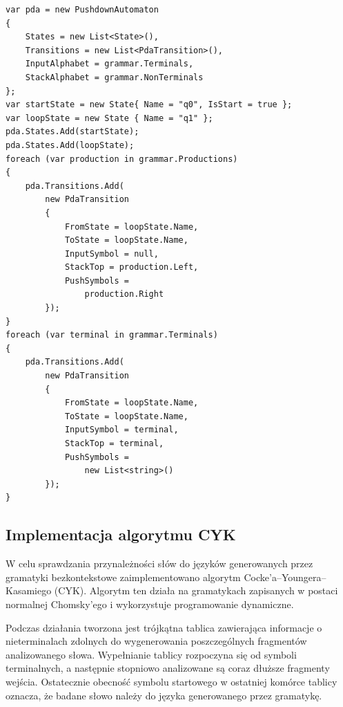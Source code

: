 \documentclass[12pt]{article}
\begin{document}
\begin{lstlisting}[language={[Sharp]C},
caption={Konstrukcja automatu ze stosem na podstawie gramatyki bezkontekstowej},
label={lst:cfg-pda}]
var pda = new PushdownAutomaton
{
    States = new List<State>(),
    Transitions = new List<PdaTransition>(),
    InputAlphabet = grammar.Terminals,
    StackAlphabet = grammar.NonTerminals
};
var startState = new State{ Name = "q0", IsStart = true };
var loopState = new State { Name = "q1" };
pda.States.Add(startState);
pda.States.Add(loopState);
foreach (var production in grammar.Productions)
{
    pda.Transitions.Add(
        new PdaTransition
        {
            FromState = loopState.Name,
            ToState = loopState.Name,
            InputSymbol = null,
            StackTop = production.Left,
            PushSymbols =
                production.Right
        });
}
foreach (var terminal in grammar.Terminals)
{
    pda.Transitions.Add(
        new PdaTransition
        {
            FromState = loopState.Name,
            ToState = loopState.Name,
            InputSymbol = terminal,
            StackTop = terminal,
            PushSymbols =
                new List<string>()
        });
}
\end{lstlisting}


\subsection{Implementacja algorytmu CYK} \cite{younger1967,kasami1965}

W celu sprawdzania przynależności słów do języków generowanych przez gramatyki bezkontekstowe zaimplementowano algorytm Cocke'a--Youngera--Kasamiego (CYK). Algorytm ten działa na gramatykach zapisanych w postaci normalnej Chomsky'ego i wykorzystuje programowanie dynamiczne.

Podczas działania tworzona jest trójkątna tablica zawierająca informacje o nieterminalach zdolnych do wygenerowania poszczególnych fragmentów analizowanego słowa. Wypełnianie tablicy rozpoczyna się od symboli terminalnych, a następnie stopniowo analizowane są coraz dłuższe fragmenty wejścia. Ostatecznie obecność symbolu startowego w ostatniej komórce tablicy oznacza, że badane słowo należy do języka generowanego przez gramatykę.

\clearpage
\end{document}
